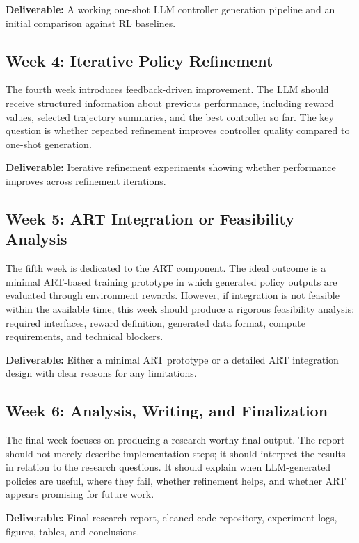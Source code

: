 \documentclass[12pt]{article}
\newcommand{\deliverable}[1]{\textbf{Deliverable:} #1}
\begin{document}
\deliverable{A working one-shot LLM controller generation pipeline and an initial comparison against RL baselines.}

\subsection*{Week 4: Iterative Policy Refinement}

The fourth week introduces feedback-driven improvement. The LLM should receive structured information about previous performance, including reward values, selected trajectory summaries, and the best controller so far. The key question is whether repeated refinement improves controller quality compared to one-shot generation.

\deliverable{Iterative refinement experiments showing whether performance improves across refinement iterations.}

\subsection*{Week 5: ART Integration or Feasibility Analysis}

The fifth week is dedicated to the ART component. The ideal outcome is a minimal ART-based training prototype in which generated policy outputs are evaluated through environment rewards. However, if integration is not feasible within the available time, this week should produce a rigorous feasibility analysis: required interfaces, reward definition, generated data format, compute requirements, and technical blockers.

\deliverable{Either a minimal ART prototype or a detailed ART integration design with clear reasons for any limitations.}

\subsection*{Week 6: Analysis, Writing, and Finalization}

The final week focuses on producing a research-worthy final output. The report should not merely describe implementation steps; it should interpret the results in relation to the research questions. It should explain when LLM-generated policies are useful, where they fail, whether refinement helps, and whether ART appears promising for future work.

\deliverable{Final research report, cleaned code repository, experiment logs, figures, tables, and conclusions.}
\end{document}
